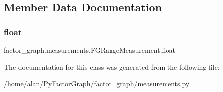 \subsection{Member Data Documentation}
\mbox{\label{classfactor__graph_1_1measurements_1_1FGRangeMeasurement_a368db610c77571723e4555542fcb62ba}}
\subsubsection{\texorpdfstring{float}{float}}
{\footnotesize\ttfamily factor\+\_\+graph.\+measurements.\+F\+G\+Range\+Measurement.\+float\hspace{0.3cm}{\ttfamily [static]}}



The documentation for this class was generated from the following file\+:\begin{DoxyCompactItemize}
\item
/home/alan/\+Py\+Factor\+Graph/factor\+\_\+graph/\hyperlink{measurements_8py}{measurements.\+py}\end{DoxyCompactItemize}
